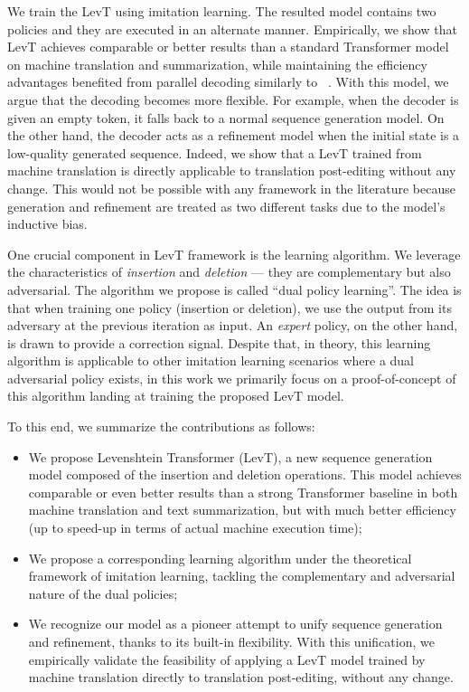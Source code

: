 \documentclass{article}
\begin{document}
We train the LevT using imitation learning. The resulted model contains two policies and they are executed in an alternate manner. Empirically, we show that LevT achieves comparable or better results than a standard Transformer model on machine translation and summarization, while maintaining the efficiency advantages benefited from parallel decoding similarly to ~\citep{lee2018deterministic}.
With this model, we argue that the decoding becomes more flexible. For example, when the decoder is given an empty token, it falls back to a normal sequence generation model.
On the other hand, the decoder acts as a refinement model when the initial state is a low-quality generated sequence. 
Indeed, we show that a LevT trained from machine translation is directly applicable to translation post-editing without any change. This would not be possible with any framework in the literature because generation and refinement are treated as two different tasks due to the model's inductive bias.

One crucial component in LevT framework is the learning algorithm. 
We leverage the characteristics of \emph{insertion} and \emph{deletion} --- they are complementary but also adversarial.
The algorithm we propose is called ``dual policy learning''.
The idea is that when training one policy (insertion or deletion), we use the output from its adversary at the previous iteration as input. 
An \emph{expert} policy, on the other hand, is drawn to provide a correction signal.
Despite that, in theory, this learning algorithm is applicable to other imitation learning scenarios where a dual adversarial policy exists, in this work we primarily focus on a proof-of-concept of this algorithm landing at training the proposed LevT model. 

To this end, we summarize the contributions as follows:
\begin{itemize}[leftmargin=*]
\item We propose Levenshtein Transformer (LevT), a new sequence generation model composed of the insertion and deletion operations.
    This model achieves comparable or even better results than a strong Transformer baseline in both machine translation and text summarization, but with much better efficiency (up to  speed-up in terms of actual machine execution time);
    \item  We propose a corresponding learning algorithm under the theoretical framework of imitation learning, tackling the complementary and adversarial nature of the dual policies;
    \item We recognize our model as a pioneer attempt to unify sequence generation and refinement, thanks to its built-in flexibility. With this unification, we empirically validate the feasibility of applying a LevT model trained by machine translation directly to translation post-editing, without any change. 
\end{itemize}
\end{document}
